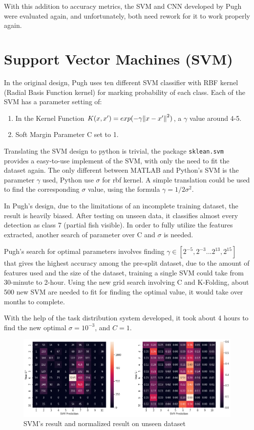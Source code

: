 \documentclass[bsc,logo,twoside,fullspacing,parskip]{infthesis}
\begin{document}
With this addition to accuracy metrics, the SVM and CNN developed by Pugh were evaluated again, and unfortunately, both need rework for it to work properly again.

\section{Support Vector Machines (SVM)}

In the original design, Pugh uses ten different SVM classifier with RBF kernel (Radial Basis Function kernel) for marking probability of each class. Each of the SVM has a parameter setting of:
\renewcommand{\labelenumi}{\arabic{enumi}}
\begin{enumerate}
	\item In the Kernel Function \(K(x,x') = exp(-\gamma\norm{x-x'}^2)\), a \(\gamma\) value around 4-5.
	\item Soft Margin Parameter C set to 1.
\end{enumerate}
Translating the SVM design to python is trivial, the package {\tt sklean.svm} provides a easy-to-use implement of the SVM, with only the need to fit the dataset again.
The only different between MATLAB and Python's SVM is the parameter \(\gamma\) used, Python use \(\sigma\) for rbf kernel. A simple translation could be used to find the corresponding \(\sigma\) value, using the formula \( \gamma = 1/2\sigma^2 \).

In Pugh's design, due to the limitations of an incomplete training dataset, the result is heavily biased. After testing on unseen data, it classifies almost every detection as class 7 (partial fish visible). In order to fully utilize the features extracted, another search of parameter over C and \(\sigma\) is needed.

Pugh's search for optimal parameters involves finding \(\gamma\in[2^{-5},2^{-3}...2^{13},2^{15}]\) that gives the highest accuracy among the pre-split dataset, due to the amount of features used and the size of the dataset, training a single SVM could take from 30-minute to 2-hour. Using the new grid search involving C and K-Folding, about 500 new SVM are needed to fit for finding the optimal value, it would take over months to complete.

With the help of the task distribution system developed, it took about 4 hours to find the
new optimal \(\sigma = 10^{-3}\), and \(C = 1\).

\begin{figure}[h]
\centering
    \includegraphics[scale=0.44]{graph/svmresult.png}
    \caption{SVM's result and normalized result on unseen dataset}
    \label{fig:svmacc}
\end{figure}
\end{document}
